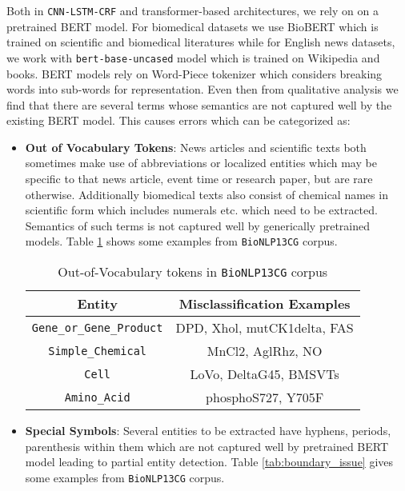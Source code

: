 Both in \texttt{CNN-LSTM-CRF} and transformer-based architectures, we rely on on a pretrained BERT model. For biomedical datasets we use BioBERT which is trained on scientific and biomedical literatures while for English news datasets, we work with \texttt{bert-base-uncased} model which is trained on Wikipedia and books. BERT models rely on Word-Piece tokenizer\cite{} which considers breaking words into sub-words for representation. Even then from qualitative analysis we find that there are several terms whose semantics are not captured well by the existing BERT model. This causes errors which can be categorized as:

\begin{itemize}
    \item \textbf{Out of Vocabulary Tokens}: News articles and scientific texts both sometimes make use of abbreviations or localized entities which may be specific to that news article, event time or research paper, but are rare otherwise. Additionally biomedical texts also consist of chemical names in scientific form which includes numerals etc. which need to be extracted. Semantics of such terms is not captured well by generically pretrained models. Table \ref{tab:oov_issue} shows some examples from \texttt{BioNLP13CG} corpus.
    
    \begin{table}[h!]
    \centering
    \begin{tabular}{|c|c|}\hline
    	\textbf{Entity} & \textbf{Misclassification Examples}\\\hline
    	\texttt{Gene\_or\_Gene\_Product} & DPD, Xhol, mutCK1delta, FAS\\\hline
    	\texttt{Simple\_Chemical} & MnCl2, AglRhz, NO\\\hline
    	\texttt{Cell} & LoVo, DeltaG45, BMSVTs\\\hline
    	\texttt{Amino\_Acid} & phosphoS727, Y705F\\\hline
    	\end{tabular}
        \caption{Out-of-Vocabulary tokens in \texttt{BioNLP13CG} corpus}
        \label{tab:oov_issue}
    \end{table}
    
    \item \textbf{Special Symbols}: Several entities to be extracted have hyphens, periods, parenthesis within them which are not captured well by pretrained BERT model leading to partial entity detection. Table \ref{tab:boundary_issue} gives some examples from \texttt{BioNLP13CG} corpus.
    

\end{itemize}
